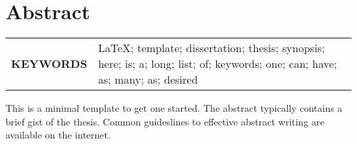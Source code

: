 \chapter{Abstract}
\begin{tabular}{@{} >{\bfseries}p{} p{} @{}}
\MakeUppercase{Keywords} &
{\LaTeX}; template; dissertation; thesis; synopsis; here; is; a; long; 
list; of; keywords; one; can; have; as; many; as; desired\\
\end{tabular}
\par

\begin{doublespacing}
This is a minimal template to get one started. The abstract typically contains a
brief gist of the thesis. Common guideslines to effective abstract writing are 
available on the internet.
\end{doublespacing}
